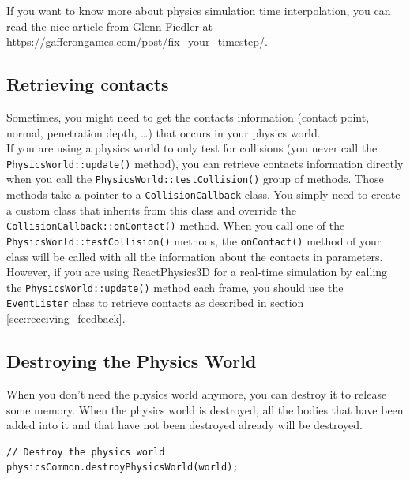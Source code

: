 \documentclass[a4paper,12pt]{article}
\begin{document}
    \vspace{0.6cm}

    If you want to know more about physics simulation time interpolation, you can read the nice article from Glenn Fiedler
    at \url{https://gafferongames.com/post/fix_your_timestep/}.

    \subsection{Retrieving contacts}

    Sometimes, you might need to get the contacts information (contact point, normal, penetration depth, \dots) that occurs in your physics world. \\

    If you are using a physics world to only test for collisions (you never call the \texttt{PhysicsWorld::update()} method), you can retrieve contacts
    information directly when you call the \texttt{PhysicsWorld::testCollision()} group of methods. Those methods take a pointer to a
    \texttt{CollisionCallback} class. You simply need to create a custom class that inherits from this class and override the
    \texttt{CollisionCallback::onContact()} method. When you call one of the \texttt{PhysicsWorld::testCollision()} methods, the \texttt{onContact()} method
    of your class will be called with all the information about the contacts in parameters. \\

    However, if you are using ReactPhysics3D for a real-time simulation by calling the \texttt{PhysicsWorld::update()} method each frame, you should
    use the \texttt{EventLister} class to retrieve contacts as described in section \ref{sec:receiving_feedback}.

    \subsection{Destroying the Physics World}

    When you don't need the physics world anymore, you can destroy it to release some memory. 
    When the physics world is destroyed, all the bodies that have been added into it and that have not been destroyed already will
    be destroyed. \\

    \begin{lstlisting}
// Destroy the physics world
physicsCommon.destroyPhysicsWorld(world);
    \end{lstlisting}
\end{document}
